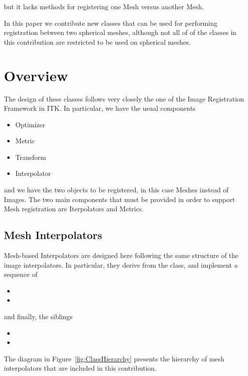 \documentclass{InsightArticle}
\begin{document}
but it lacks methods for registering one Mesh versus another Mesh.

In this paper we contribute new classes that can be used for performing
registration between two spherical meshes, although not all of of the classes
in this contribution are restricted to be used on spherical meshes.

\section{Overview}

The design of these classes follows very closely the one of the Image
Registration Framework in ITK.  In particular, we have the usual components

\begin{itemize}
\item Optimizer
\item Metric
\item Transform
\item Interpolator
\end{itemize}

and we have the two objects to be registered, in this case Meshes instead of
Images. The two main components that must be provided in order to support Mesh
registration are Iterpolators and Metrics.

\subsection{Mesh Interpolators}

Mesh-based Interpolators are designed here following the same structure of the
image interpolators. In particular, they derive from the 
class, and implement a sequence of 

\begin{itemize}
\item {}
\item {}
\end{itemize}

 and finally, the siblings

\begin{itemize}
\item {}
\item {}
\end{itemize}

The diagram in Figure~\ref{fig:ClassHierarchy} presents the hierarchy of mesh
interpolators that are included in this contribution.
\end{document}
